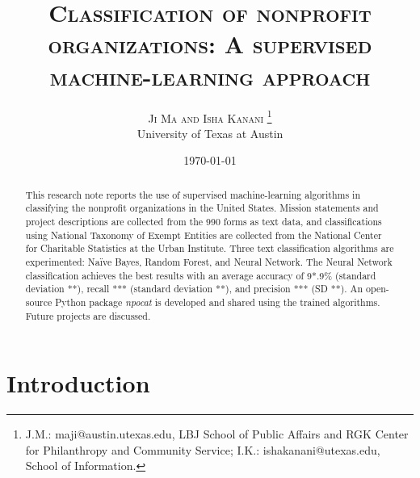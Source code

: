 \documentclass[11pt]{article}
\title{{\textsc{Classification of nonprofit organizations: A supervised machine-learning approach}}}
\author{%
\textsc{Ji Ma and Isha Kanani} \thanks{J.M.: maji@austin.utexas.edu, LBJ School of Public Affairs and RGK Center for Philanthropy and Community Service; I.K.: ishakanani@utexas.edu, School of Information.} \\[1ex] %
\normalsize University of Texas at Austin \\ %
}
\date{\today} %
\begin{document}
\maketitle

\begin{abstract}
\noindent This research note reports the use of supervised machine-learning algorithms in classifying the nonprofit organizations in the United States. Mission statements and project descriptions are collected from the 990 forms as text data, and classifications using National Taxonomy of Exempt Entities are collected from the National Center for Charitable Statistics at the Urban Institute. Three text classification algorithms are experimented: Na\"ive Bayes, Random Forest, and Neural Network. The Neural Network classification achieves the best results with an average accuracy of 9*.9\% (standard deviation **), recall *** (standard deviation **), and precision *** (SD **). An open-source Python package \textit{npocat} is developed and shared using the trained algorithms. Future projects are discussed.

\end{abstract}
\clearpage

\tableofcontents
\listoftables
\listoffigures
\clearpage

\section{Introduction}
\end{document}
